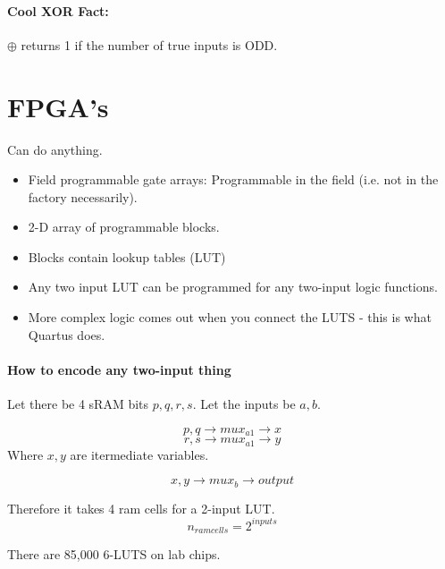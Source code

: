 \documentclass[a4paper,12pt]{report}
\begin{document}
\paragraph{Cool XOR Fact: } $\oplus$ returns 1 if the number of true inputs is ODD.

\section{FPGA's}
Can do anything.
\begin{itemize}
\item Field programmable gate arrays: Programmable in the field (i.e. not in the factory necessarily).
\item 2-D array of programmable blocks.
\item Blocks contain lookup tables (LUT)
\item Any two input LUT can be programmed for any two-input logic functions.
\item More complex logic comes out when you connect the LUTS - this is what Quartus does.
\end{itemize}

\paragraph{How to encode any two-input thing}
Let there be 4 sRAM bits $p, q, r, s$. Let the inputs be $a, b$. 

$${p, q} \to mux_{a1} \to x$$
$${r, s} \to mux_{a1} \to y$$
Where $x, y$ are itermediate variables.

$${x, y} \to mux_{b} \to output$$

Therefore it takes 4 ram cells for a 2-input LUT. $$n_{ramcells} = 2^{inputs}$$

There are 85,000 6-LUTS on lab chips.
\end{document}
